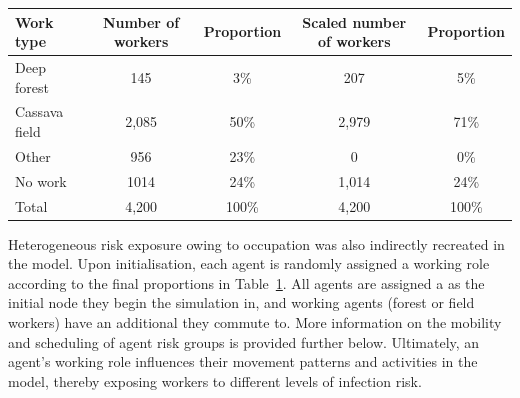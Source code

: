 \begin{table}[h]
    \centering
    \begin{adjustbox}{center}
        \begin{tabular}{lcccc} \toprule
            Work type & Number of workers & Proportion & Scaled number of workers & Proportion \\ \midrule
            Deep forest & 145 & 3\% & 207 & 5\% \\
            Cassava field & 2,085 & 50\% & 2,979 & 71\% \\
            Other & 956 & 23\% & 0 & 0\% \\
            No work & 1014 & 24\% & 1,014 & 24\% \\ \midrule
            Total & 4,200 & 100\%& 4,200 & 100\% \\ \bottomrule
        \end{tabular}
    \end{adjustbox}
    \label{tab:data-occupations}
\end{table}

Heterogeneous risk exposure owing to occupation was also indirectly recreated in the model. Upon initialisation, each agent is randomly assigned a working role according to the final proportions in Table~\ref{tab:data-occupations}. All agents are assigned a  as the initial node they begin the simulation in, and working agents (forest or field workers) have an additional  they commute to. More information on the mobility and scheduling of agent risk groups is provided further below. Ultimately, an agent's working role influences their movement patterns and activities in the model, thereby exposing workers to different levels of infection risk.



